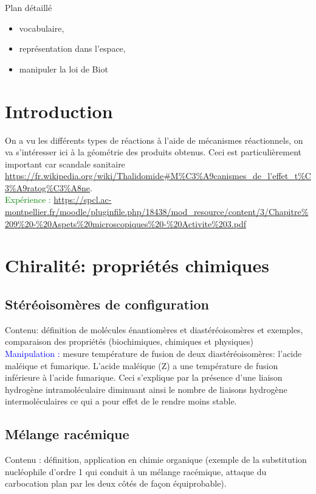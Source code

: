 \begin{reportBlock}{Plan détaillé}
\begin{itemize}
\item vocabulaire,
\item représentation dans l'espace,
\item manipuler la loi de Biot
\end{itemize}


\section*{Introduction}
On a vu les différents types de réactions à l'aide de mécanismes réactionnels, on va s'intéresser ici à la géométrie des produits obtenus. Ceci est particulièrement important car scandale sanitaire \url{https://fr.wikipedia.org/wiki/Thalidomide#M\%C3\%A9canismes_de_l'effet_t\%C3\%A9ratog\%C3\%A8ne}.\\

\textcolor{green}{Expérience :} \url{https://spcl.ac-montpellier.fr/moodle/pluginfile.php/18438/mod_resource/content/3/Chapitre\%209\%20-\%20Aspets\%20microscopiques\%20-\%20Activite\%203.pdf}

\section{Chiralité: propriétés chimiques}

\subsection{Stéréoisomères de configuration}
Contenu: définition de molécules énantiomères et diastéréoisomères et exemples, comparaison des propriétés (biochimiques, chimiques et physiques)\\

\textcolor{blue}{Manipulation :} mesure température de fusion de deux diastéréoisomères: l’acide maléique et fumarique. L’acide maléique (Z) a une température de fusion inférieure à l’acide fumarique. Ceci s’explique par la présence d’une liaison hydrogène intramoléculaire diminuant ainsi le nombre de liaisons hydrogène intermoléculaires ce qui a pour effet de le rendre moins stable.

\subsection{Mélange racémique}
Contenu : définition, application en chimie organique (exemple de la substitution nucléophile d’ordre 1 qui conduit à un mélange racémique, attaque du carbocation plan par les deux côtés de façon équiprobable).



\end{reportBlock}
